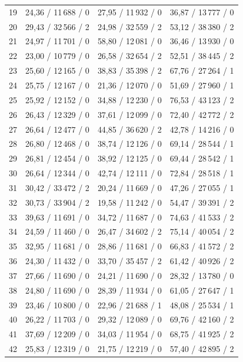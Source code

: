\documentclass[a4paper,10pt]{article}
\begin{document}
\begin{longtable}{r r r r}
19 & 24,36 / 11\,688 / 0 & 27,95 / 11\,932 / 0 & 36,87 / 13\,777 / 0\\ 
20 & 29,43 / 32\,566 / 2 & 24,98 / 32\,559 / 2 & 53,12 / 38\,380 / 2\\ 
21 & 24,97 / 11\,701 / 0 & 58,80 / 12\,081 / 0 & 36,46 / 13\,930 / 0\\ 
22 & 23,00 / 10\,779 / 0 & 26,58 / 32\,654 / 2 & 52,51 / 38\,445 / 2\\ 
23 & 25,60 / 12\,165 / 0 & 38,83 / 35\,398 / 2 & 67,76 / 27\,264 / 1\\ 
24 & 25,75 / 12\,167 / 0 & 21,36 / 12\,070 / 0 & 51,69 / 27\,960 / 1\\ 
25 & 25,92 / 12\,152 / 0 & 34,88 / 12\,230 / 0 & 76,53 / 43\,123 / 2\\ 
26 & 26,43 / 12\,329 / 0 & 37,61 / 12\,099 / 0 & 72,40 / 42\,772 / 2\\ 
27 & 26,64 / 12\,477 / 0 & 44,85 / 36\,620 / 2 & 42,78 / 14\,216 / 0\\ 
28 & 26,80 / 12\,468 / 0 & 38,74 / 12\,126 / 0 & 69,14 / 28\,544 / 1\\ 
29 & 26,81 / 12\,454 / 0 & 38,92 / 12\,125 / 0 & 69,44 / 28\,542 / 1\\ 
30 & 26,64 / 12\,344 / 0 & 42,74 / 12\,111 / 0 & 72,84 / 28\,518 / 1\\ 
31 & 30,42 / 33\,472 / 2 & 20,24 / 11\,669 / 0 & 47,26 / 27\,055 / 1\\ 
32 & 30,73 / 33\,904 / 2 & 19,58 / 11\,242 / 0 & 54,47 / 39\,391 / 2\\ 
33 & 39,63 / 11\,691 / 0 & 34,72 / 11\,687 / 0 & 74,63 / 41\,533 / 2\\ 
34 & 24,59 / 11\,460 / 0 & 26,47 / 34\,602 / 2 & 75,14 / 40\,054 / 2\\ 
35 & 32,95 / 11\,681 / 0 & 28,86 / 11\,681 / 0 & 66,83 / 41\,572 / 2\\ 
36 & 24,30 / 11\,432 / 0 & 33,70 / 35\,457 / 2 & 61,42 / 40\,926 / 2\\ 
37 & 27,66 / 11\,690 / 0 & 24,21 / 11\,690 / 0 & 28,32 / 13\,780 / 0\\ 
38 & 24,80 / 11\,690 / 0 & 28,39 / 11\,934 / 0 & 61,05 / 27\,647 / 1\\ 
39 & 23,46 / 10\,800 / 0 & 22,96 / 21\,688 / 1 & 48,08 / 25\,534 / 1\\ 
40 & 26,22 / 11\,703 / 0 & 29,32 / 12\,089 / 0 & 69,76 / 42\,160 / 2\\ 
41 & 37,69 / 12\,209 / 0 & 34,03 / 11\,954 / 0 & 68,75 / 41\,925 / 2\\ 
42 & 25,83 / 12\,319 / 0 & 21,75 / 12\,219 / 0 & 57,40 / 42\,895 / 2\\ 

\end{longtable}
\end{document}

